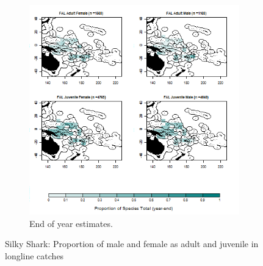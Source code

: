 \documentclass[12pt]{SCreport}
\begin{document}
\begin{landscape}
\begin{figure}
\begin{subfigure}[b]{0.6\textwidth}
       \includegraphics[width=\textwidth]{../GRAPHICS/Defined/BI_21_Map_maturity_sex_FAL}
       \caption{End of year estimates.}
       \label{fig:test2}
   \end{subfigure}
\caption{Silky Shark: Proportion of male and female as adult and juvenile in longline catches }
\label{fig:test} 
\end{figure}
\end{landscape}
\end{document}
